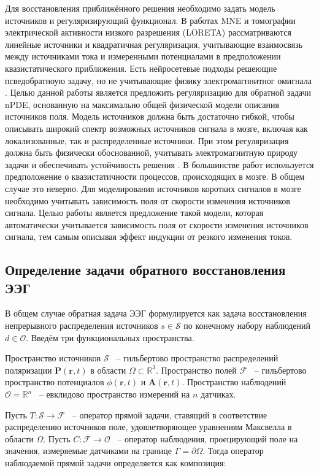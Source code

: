 \documentclass[a4paper,14pt,oneside,openany]{extarticle}
\begin{document}
Для восстановления приближённого решения необходимо задать модель источников и регуляризирующий функционал. 
В работах MNE \cite{Grech2008} и томографии электрической активности низкого разрешения (LORETA) \cite{Weinstein1999}
рассматриваются линейные источники и квадратичная регуляризация, учитывающие взаимосвязь между
источниками тока и измеренными потенциалами в предположении квазистатического приближения. Есть нейросетевые подходы
решеющие псведобратноую задачу, но не учитывающие физику электромагннитног омигнала \cite{Morik2024}.
Целью данной работы является предложить регуляризацию
для обратной задачи nPDE, основанную на максимально общей физической модели описания источников поля. 
Модель источников должна быть достаточно гибкой, чтобы описывать широкий спектр возможных источников сигнала в мозге, 
включая как локализованные, так и распределенные источники.
При этом регуляризация должна быть физически обоснованной, учитывать электромагнитную природу задачи 
и обеспечивать устойчивость решения \cite{Paraskevopoulou2023}.
В большинстве работ используется предположение о квазистатичности процессов, происходящих в мозге. 
В общем случае это неверно. Для моделирования источников коротких сигналов в мозге необходимо учитывать 
зависимость поля от скорости изменения источников сигнала. 
Целью работы является предложение такой модели, которая автоматически учитывается зависимость поля от 
скорости изменения источников сигнала, тем самым описывая эффект индукции от резкого изменения токов. 

\subsection{Определение задачи обратного восстановления ЭЭГ}

В общем случае обратная задача ЭЭГ формулируется как задача восстановления
непрерывного распределения источников $s \in \mathcal{S}$ по конечному набору наблюдений $d \in \mathcal{O}$.
Введём три функциональных пространства.



Пространство источников $\mathcal{S}$ ~-- гильбертово пространство распределений поляризации 
$\mathbf{P}(\mathbf{r}, t)$ в области $\Omega \subset \mathbb{R}^3$.
Пространство полей $\mathcal{F}$ ~-- гильбертово пространство потенциалов $\phi(\mathbf{r}, t)$ и 
$\mathbf{A}(\mathbf{r}, t)$.
Пространство наблюдений $\mathcal{O} = \mathbb{R}^n$ ~-- евклидово пространство измерений на $n$ датчиках.

Пусть $T: \mathcal{S} \to \mathcal{F}$ ~-- оператор прямой задачи, ставящий в соответствие распределению 
источников поле, удовлетворяющее уравнениям Максвелла в области $\Omega$. Пусть $C: \mathcal{F} \to \mathcal{O}$ 
~-- оператор наблюдения, проецирующий поле на значения, измеряемые датчиками на границе $\Gamma = \partial\Omega$. 
Тогда оператор наблюдаемой прямой задачи определяется как композиция:
\end{document}
